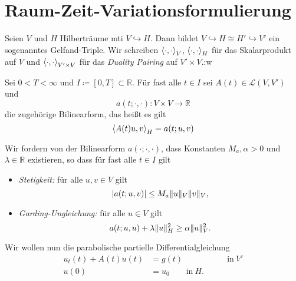 
\section{Raum-Zeit-Variationsformulierung} %
\label{sec:raum_zeit_variationsformulierung}

Seien $V$ und $H$ Hilberträume mti $V \hookrightarrow H$.
Dann bildet $V \hookrightarrow H \cong H' \hookrightarrow V'$ ein sogenanntes
Gelfand-Triple.
Wir schreiben $\left\langle\cdot,\cdot\right\rangle_{V}$, $\left\langle\cdot,\cdot\right\rangle_{H}$ für das
Skalarprodukt auf $V$ und $\left\langle\cdot,\cdot\right\rangle_{V' \times V}$ für das
\emph{Duality Pairing} auf $V' \times V$.:w

Sei $0 < T < \infty$ und $I \coloneqq [0, T] \subset \mathbb{R}$.
Für fast alle $t \in I$ sei $A(t) \in \mathcal L(V, V')$ und
\begin{equation}
    a(t; \cdot, \cdot) \colon V \times V \to \mathbb{R}
\end{equation}
die zugehörige Bilinearform, das heißt es gilt
\begin{equation}
    \left\langle A(t)u,v\right\rangle_{H} = a(t; u, v)
\end{equation}

Wir fordern von der Bilinearform $a(\cdot; \cdot, \cdot)$, dass Konstanten $M_a,
\alpha > 0$ und $\lambda \in \mathbb{R}$ existieren, so dass für fast alle $t
\in I$ gilt
\begin{itemize}
    \item \emph{Stetigkeit:} für alle $u, v \in V$ gilt
        \begin{equation}
            \label{eq:stetigkeit}
            \lvert a(t; u, v)\rvert \leq M_a \lVert u\rVert_V \lVert v\rVert_V,
        \end{equation}
    \item \emph{Garding-Ungleichung:} für alle $u \in V$ gilt
        \begin{equation}
            \label{eq:garding-inequality}
            a(t; u, u) + \lambda \lVert u\rVert^2_H \geq \alpha \lVert u\rVert^2_V.
        \end{equation}
\end{itemize}

Wir wollen nun die parabolische partielle Differentialgleichung
\begin{equation}
    \label{eq:}
    \begin{aligned}
        u_t(t) + A(t) u(t) &= g(t) &\qquad \text{in}~V'\\
        u(0) &= u_0 \qquad \text{in}~H.
    \end{aligned}
\end{equation}

